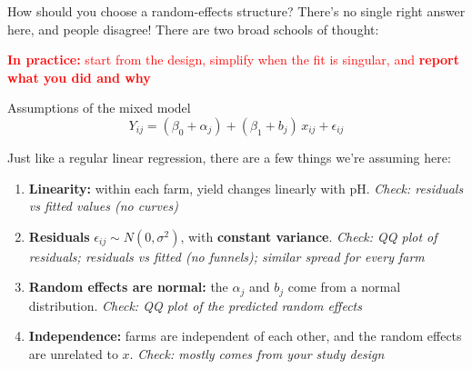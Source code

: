 \documentclass[
  ignorenonframetext,
  aspectratio=169,
]{beamer}
\providecommand{\tightlist}{%
  \setlength{\itemsep}{0pt}\setlength{\parskip}{0pt}}\usepackage{longtable,booktabs,array}
\begin{document}
\begin{frame}[fragile]{How should you choose a random-effects
structure?}
\label{how-should-you-choose-a-random-effects-structure}
There's no single right answer here, and people disagree! There are two
broad schools of thought:

\pause


\pause

\begin{center}
\textcolor{red}{\textbf{In practice:} start from the design, simplify when the fit is singular, and \textbf{report what you did and why}}
\end{center}
\end{frame}

\begin{frame}{Assumptions of the mixed model}
\label{assumptions-of-the-mixed-model}
\[Y_{ij} = (\beta_0 + \alpha_j) + (\beta_1 + b_j)\, x_{ij} + \epsilon_{ij}\]

Just like a regular linear regression, there are a few things we're
assuming here:

\small

\begin{enumerate}
\tightlist
\item
  \textbf{Linearity:} within each farm, yield changes linearly with pH.
  \emph{Check: residuals vs fitted values (no curves)}
\item
  \textbf{Residuals} \(\epsilon_{ij} \sim N(0, \sigma^2)\), with
  \textbf{constant variance}. \emph{Check: QQ plot of residuals;
  residuals vs fitted (no funnels); similar spread for every farm}
\item
  \textbf{Random effects are normal:} the \(\alpha_j\) and \(b_j\) come
  from a normal distribution. \emph{Check: QQ plot of the predicted
  random effects}
\item
  \textbf{Independence:} farms are independent of each other, and the
  random effects are unrelated to \(x\). \emph{Check: mostly comes from
  your study design}
\end{enumerate}

\normalsize
\end{frame}
\end{document}
